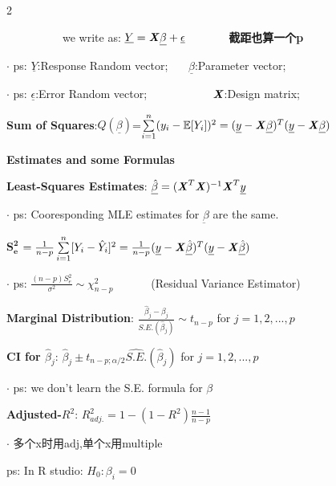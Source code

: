 \documentclass[9pt]{article}
\begin{document}
\begin{multicols}{2}
        \begin{flushleft}
            \ \ \ \ \ \ \ \ \ \ we write as: $\underline{Y}=\textbf{\textit{X}}\underline{\beta}+\underline{\epsilon}$ \ \ \ \ \ \ \ \textbf{\footnotesize 截距也算一个p}

            $\cdot$ ps: $\underline{Y}$:Response Random vector; \ \ \ $\underline{\beta}$:Parameter vector;

            $\cdot$ ps: $\underline{\epsilon}$:Error Random vector; \ \ \ \ \ \ \  \ \ \ \ $\textbf{\textit{X}}$:Design matrix;

            \textbf{\footnotesize Sum of Squares}:$Q(\underline{\beta})$=$\sum\limits_{i=1}^{n}(y_i-\mathbb{E}[Y_i])^2=(\underline{y}-\textbf{\textit{X}}\underline{\beta})^T(\underline{y}-\textbf{\textit{X}}\underline{\beta})$
        \end{flushleft}

        \columnbreak

        \begin{center}
            \small \textbf{Estimates and some Formulas}
        \end{center}
        \vspace{-0.2cm}

        \textbf{\small Least-Squares Estimates}: $\underline{\hat{\beta}}=(\textbf{\textit{X}}^T\textbf{\textit{X}})^{-1}\textbf{\textit{X}}^T\underline{y}$

        $\cdot$ ps: Cooresponding MLE estimates for $\underbar{\beta}$ are the same.

        $\mathbf{S^2_e}$ $=\frac{1}{n-p}\sum\limits_{i=1}^{n}[Y_i-\hat{Y}_i]^2=\frac{1}{n-p}(\underline{y}-\textbf{\textit{X}}\underline{\hat{\beta}})^T(\underline{y}-\textbf{\textit{X}}\underline{\hat{\beta}})$

        $\cdot$ ps: $\frac{(n-p)S^2_e}{\sigma^2}\sim \chi^2_{n-p}$ \ \ \ \ \ \ (Residual Variance Estimator)

        \textbf{\small Marginal Distribution}: $\frac{\hat{\beta}_j-\beta_j}{S.E.(\hat{\beta}_j)}\sim t_{n-p}$ for $j=1,2,...,p$

        \textbf{\small CI for $\hat{\beta}_j$}: $\hat{\beta}_j\pm t_{n-p;\alpha/2}\widehat{S.E.}(\hat{\beta}_j)$ for $j=1,2,...,p$

        $\cdot$ ps: we don't learn the S.E. formula for $\beta$

        \textbf{Adjusted-$R^2$}: $R^2_{adj.}=1-(1-R^2)\frac{n-1}{n-p}$

        $\cdot$ 多个x时用adj,单个x用multiple

        ps: In R studio: $H_0:\beta_i=0$

    \end{multicols}
    \vspace{-0.4cm}
\end{document}
